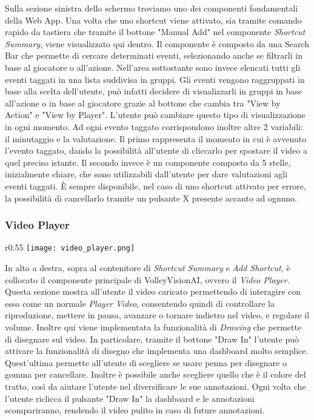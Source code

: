 Sulla sezione sinistra dello schermo troviamo uno dei componenti fondamentali della Web App. Una volta che uno shortcut viene attivato, sia tramite comando rapido da tastiera che tramite il bottone "Manual Add" nel componente \textit{Shortcut Summary}, viene visualizzato qui dentro. Il componente è composto da una Search Bar che permette di cercare determinati eventi, selezionando anche se filtrarli in base al giocatore o all'azione. Nell'area sottostante sono invece elencati tutti gli eventi taggati in una lista suddivisa in gruppi. Gli eventi vengono raggruppati in base alla scelta dell'utente, può infatti decidere di visualizzarli in gruppi in base all'azione o in base al giocatore grazie al bottone che cambia tra "View by Action" e "View by Player". L'utente può cambiare questo tipo di visualizzazione in ogni momento. Ad ogni evento taggato corrispondono inoltre altre 2 variabili: il minutaggio e la valutazione. Il primo rappresenta il momento in cui è avvenuto l'evento taggato, dando la possibilità all'utente di cliccarlo per spostare il video a quel preciso istante. Il secondo invece è un componente composto da 5 stelle, inizialmente chiare, che sono utilizzabili dall'utente per dare valutazioni agli eventi taggati. È sempre disponibile, nel caso di uno shortcut attivato per errore, la possibilità di cancellarlo tramite un pulsante X presente accanto ad ognuno.

\subsubsection{Video Player}
\begin{wrapfigure}{r}{0.55\textwidth}
    \centering
    \texttt{[image: video\_player.png]}
    \label{fig:video_player}
\end{wrapfigure}

In alto a destra, sopra al contenitore di \textit{Shortcut Summary} e \textit{Add Shortcut}, è collocato il componente principale di VolleyVisionAI, ovvero il \textit{Video Player}. Questa sezione mostra all'utente il video caricato permettendo di interagire con esso come un normale \textit{Player Video}, consentendo quindi di controllare la riproduzione, mettere in pausa, avanzare o tornare indietro nel video, e regolare il volume.  Inoltre qui viene implementata la funzionalità di \textit{Drawing} che permette di disegnare sul video. In particolare, tramite il bottone "Draw In" l'utente può attivare la funzionalità di disegno che implementa una dashboard molto semplice.  Quest'ultima permette all'utente di scegliere se usare penna per disegnare o gomma per cancellare. Inoltre è possibile anche scegliere quello che è il colore del tratto, così da aiutare l'utente nel diversificare le sue annotazioni. Ogni volta che l'utente riclicca il pulsante "Draw In" la dashboard e le annotazioni scompariranno, rendendo il video pulito in caso di future annotazioni.

